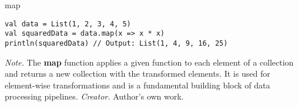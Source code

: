 \begin{table}[h!]
\caption{map}
\begin{lstlisting}
val data = List(1, 2, 3, 4, 5)
val squaredData = data.map(x => x * x)
println(squaredData) // Output: List(1, 4, 9, 16, 25)
\end{lstlisting}
\small
\textit{Note.} The \textbf{map} function applies a given function to each element of a collection and returns a new collection with the transformed elements. It is used for element-wise transformations and is a fundamental building block of data processing pipelines.
\textit{Creator.} Author's own work.
\end{table}